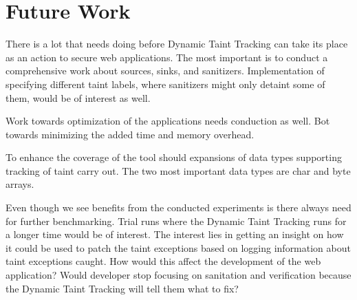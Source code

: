 \chapter{Future Work}

There is a lot that needs doing before Dynamic Taint Tracking can take its place as an action to secure web applications. The most important is to conduct a comprehensive work about sources, sinks, and sanitizers. Implementation of specifying different taint labels, where sanitizers might only detaint some of them, would be of interest as well.

Work towards optimization of the applications needs conduction as well. Bot towards minimizing the added time and memory overhead.

To enhance the coverage of the tool should expansions of data types supporting tracking of taint carry out. The two most important data types are char and byte arrays. 

Even though we see benefits from the conducted experiments is there always need for further benchmarking. Trial runs where the Dynamic Taint Tracking runs for a longer time would be of interest. The interest lies in getting an insight on how it could be used to patch the taint exceptions based on logging information about taint exceptions caught. How would this affect the development of the web application? Would developer stop focusing on sanitation and verification because the Dynamic Taint Tracking will tell them what to fix?
